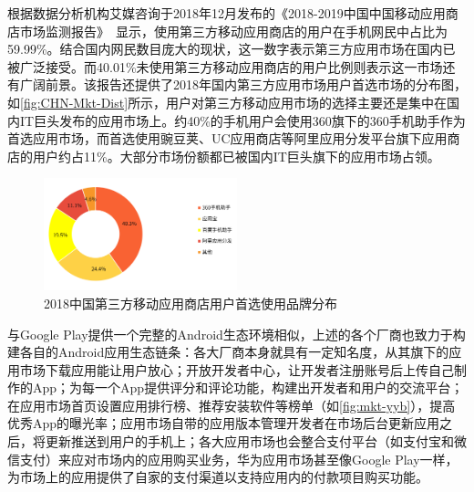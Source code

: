 根据数据分析机构艾媒咨询于2018年12月发布的《2018-2019中国中国移动应用商店市场监测报告》~\cite{ChineseAppStoreReport}显示，使用第三方移动应用商店的用户在手机网民中占比为59.99\%。结合国内网民数目庞大的现状，这一数字表示第三方应用市场在国内已被广泛接受。而40.01\%未使用第三方移动应用商店的用户比例则表示这一市场还有广阔前景。该报告还提供了2018年国内第三方应用市场用户首选市场的分布图，如\autoref{fig:CHN-Mkt-Dist}所示，用户对第三方移动应用市场的选择主要还是集中在国内IT巨头发布的应用市场上。约40\%的手机用户会使用360旗下的360手机助手作为首选应用市场，而首选使用豌豆荚、UC应用商店等阿里应用分发平台旗下应用商店的用户约占11\%。大部分市场份额都已被国内IT巨头旗下的应用市场占领。

\begin{figure}[htbp]
	\centering
	\includegraphics[width=0.5\textwidth]{./Figures/edwin-CHN-mkt-dist.png}
	\caption{2018中国第三方移动应用商店用户首选使用品牌分布}
	\label{fig:CHN-Mkt-Dist}
\end{figure}

与Google Play提供一个完整的Android生态环境相似，上述的各个厂商也致力于构建各自的Android应用生态链条：各大厂商本身就具有一定知名度，从其旗下的应用市场下载应用能让用户放心；开放开发者中心，让开发者注册账号后上传自己制作的App；为每一个App提供评分和评论功能，构建出开发者和用户的交流平台；在应用市场首页设置应用排行榜、推荐安装软件等榜单（如\autoref{fig:mkt-yyb}），提高优秀App的曝光率；应用市场自带的应用版本管理开发者在市场后台更新应用之后，将更新推送到用户的手机上；各大应用市场也会整合支付平台（如支付宝和微信支付）来应对市场内的应用购买业务，华为应用市场甚至像Google Play一样，为市场上的应用提供了自家的支付渠道以支持应用内的付款项目购买功能。

